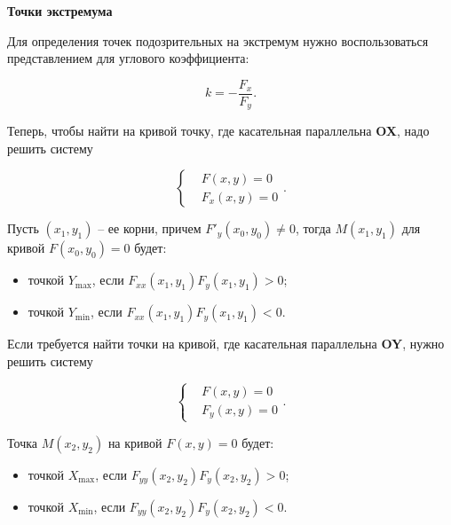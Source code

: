                 \textbf{Точки экстремума}

                    Для определения точек подозрительных на экстремум нужно  воспользоваться представлением для углового коэффициента:

                        \[
                            k = - \frac{F_{x}}{F_{y}}.
                        \]

                    Теперь, чтобы найти на кривой точку, где касательная параллельна \textbf{OX}, надо решить систему

                        \[
                            \begin{cases}
                                & F \left( x, y \right) = 0\\
                                & F_{x} \left( x, y \right) = 0
                           \end{cases}.
                        \]

                    Пусть $\left( x_{1}, y_{1} \right)$ -- ее корни, причем $F'_{y} \left( x_{0}, y_{0} \right) \neq 0$, тогда $M \left( x_{1}, y_{1} \right)$ для кривой $F \left( x_{0}, y_{0} \right) = 0$ будет:

                        \begin{itemize}
                            \item точкой $Y_{\max}$, если $F_{xx} \left( x_{1}, y_{1} \right) F_{y} \left( x_{1}, y_{1} \right) > 0$;

                            \item точкой $Y_{\min}$, если $F_{xx} \left( x_{1}, y_{1} \right) F_{y} \left( x_{1}, y_{1} \right) < 0$.
                        \end{itemize}

                    Если требуется найти точки на кривой, где касательная параллельна \textbf{OY}, нужно решить систему

                        \[
                            \begin{cases}
                                & F \left( x, y \right) = 0\\
                                & F_{y} \left( x, y \right) = 0
                           \end{cases}.
                        \]

                    Точка $M \left( x_{2}, y_{2} \right)$ на кривой $F \left( x, y \right) = 0$ будет:

                        \begin{itemize}
                            \item точкой $X_{\max}$, если $F_{yy} \left( x_{2}, y_{2} \right) F_{y} \left( x_{2}, y_{2} \right) > 0$;

                            \item точкой $X_{\min}$, если $F_{yy} \left( x_{2}, y_{2} \right) F_{y} \left( x_{2}, y_{2} \right) < 0$.
                        \end{itemize} 

